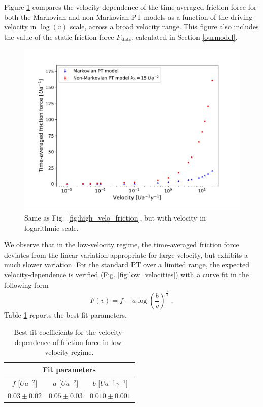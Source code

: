 Figure \ref{fig:totale_logartimX} compares the velocity dependence of the time-averaged friction force for both the Markovian and non-Markovian PT models as a function of the driving velocity in $\log{(v)}$ scale, across a broad velocity range. This figure also includes the value of the static friction force $F_\text{static}$ calculated in Section \ref{ourmodel}.
\begin{figure}
    \centering
    \includegraphics[width=\textwidth]{tot_logaritmica.pdf}
    \caption{Same as Fig.~\ref{fig:high_velo_friction}, but with velocity in logarithmic scale.}
    \label{fig:totale_logartimX}
\end{figure} We observe that in the low-velocity regime, the time-averaged friction force deviates from the linear variation appropriate for large velocity, but exhibits a much slower variation. For the standard PT over a limited range, the expected velocity-dependence is verified (Fig. \ref{fig:low_velocities}) with a curve fit in the following form  
\begin{equation}
    F(v) = f - a \log{\left(\dfrac{b}{v}\right)}^\frac{2}{3}\; ,
\end{equation}
Table \ref{tab:param_lowvel} reports the best-fit parameters.
\begin{table}
\centering
\begin{tabular}{ccc}
    \toprule
    \multicolumn{3}{c}{Fit parameters} \\
    \midrule
   $f$ [$Ua^{-2}$] &  $a$ [$Ua^{-2}$] & $b$ [$Ua^{-1}\gamma^{-1}$] \\
    \midrule 
    $0.03 \pm 0.02$ & $0.05\pm 0.03$ & $0.010 \pm 0.001$ \\
    \bottomrule
\end{tabular}
\caption{Best-fit coefficients for the velocity-dependence of friction force in low-velocity regime.}
\label{tab:param_lowvel}
\end{table}
